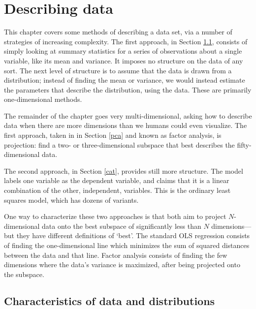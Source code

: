 \chapter{Describing data} \label{projections}
\def\xv{{\bf x} } \def\yv{{\bf y} } \def\pv{{\bf p} }
\def\Iv{{\bf I}}\def\Sv{{\bf S}}\def\yv{{\bf y}}\def\Zv{{\bf Z}} \def\cv{{\bf c}} \def\uv{{\bf u}} \def\Yv{{\bf Y}} \def\Xv{{\bf X}} \def\Qv{{\bf Q}}
\def\betav{{\mbox{\boldmath$\beta$}}}
\def\vector#1{\left[\matrix{#1}\right]}

This chapter covers some methods of describing a data set, via a
number of strategies of increasing complexity. 
The first approach, in Section \ref{basicstats}, consists of simply looking
at summary statistics for a series of observations about a single
variable, like its mean and variance. It imposes no structure on the
data of any sort. The next level of structure is to
assume that the data is drawn from a distribution; instead of finding
the mean or variance, we would instead estimate the parameters that
describe the distribution, using the data. These are primarily
one-dimensional methods.

The remainder of the chapter goes very multi-dimensional, asking how
to describe data when there are more dimensions than we humans could
even visualize. The first approach, taken in in Section \ref{pca} and
known as factor analysis,
is projection: find a two- or three-dimensional subspace that best
describes the fifty-dimensional data. 

The second approach, in Section \ref{cat}, provides still more
structure. The model labels one variable as the dependent variable, and claims
that it is a linear combination of the other, independent, variables.
This is the ordinary least squares model, which has dozens of variants.

One way to characterize these two approaches is that both aim to project
$N$-di\-men\-sion\-al data onto the best subspace of significantly less than
$N$ di\-men\-sions---but they have different definitions of `best'.
The standard OLS regression consists of
finding the one-dimensional line which minimizes the sum of squared
distances between the data and that line. Factor analysis consists
of finding the few dimensions where the data's variance is maximized, after being
projected onto the subspace.



\section{Characteristics of data and distributions}\label{basicstats}

